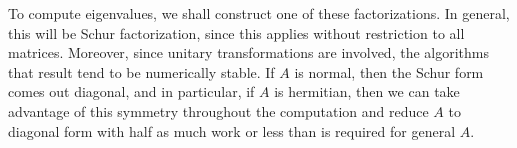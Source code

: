 To compute eigenvalues, we shall construct one of these factorizations. In general, this will be Schur factorization, since this applies without restriction to all matrices. Moreover, since unitary transformations are involved, the algorithms that result tend to be numerically stable. If $A$ is normal, then the Schur form comes out diagonal, and in particular, if $A$ is hermitian, then we can take advantage of this symmetry throughout the computation and reduce $A$ to diagonal form with half as much work or less than is required for general $A$. 